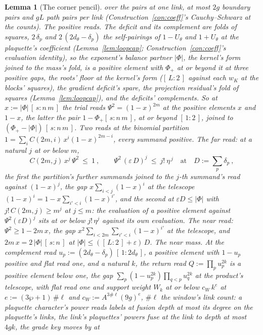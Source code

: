 \documentclass[11pt]{article}
\newtheorem{lemma}{Lemma}
\theoremstyle{definition}
\begin{document}
\begin{lemma}[The corner pencil]
over the pairs at one link, at most $2g$ boundary pairs and $gL$
path pairs per link (Construction~\ref{con:coeff}'s Cauchy--Schwarz
at the counts).
\emph{The positive reads.} The deficit and its complement are folds
of squares, $2\,\delta_p$ and $2\,(2d_\theta-\delta_p)$ the
self-pairings of $1-U_\theta$ and $1+U_\theta$ at the plaquette's
coefficient (Lemma~\ref{lem:loopcap};
Construction~\ref{con:coeff}'s evaluation identity), so the
exponent's balance partner $|\Phi|$, the kernel's form joined to
the mass's fold, is a positive element with $\Phi_+$ at or beyond
it at three positive gaps, the roots' floor at the kernel's form
($[\,L:2\,]$ against each $w_K$ at the blocks' squares), the
gradient deficit's spare, the projection residual's fold of
squares (Lemma~\ref{lem:loopcap}), and the deficits' complements.
So at $x:=|\Phi|\,[\,s:n\,m\,]$ the trial reads
$\Psi^{2}=(1-x)^{2m}$ at the positive elements $x$ and $1-x$, the
latter the pair $1-\Phi_+[\,s:n\,m\,]$, at or beyond $[\,1:2\,]$,
joined to $(\Phi_+-|\Phi|)\,[\,s:n\,m\,]$. Two reads at the
binomial partition $1=\sum_iC(2m,i)\,x^{i}(1-x)^{2m-i}$, every
summand positive. The \emph{far read}: at a natural $j$ at or
below $m$,
\[
C(2m,j)\,x^{j}\,\Psi^{2}\ \le\ 1\ ,
\qquad
\Psi^{2}\,(\varepsilon\,D)^{j}\ \le\ j!\ \eta^{\,j}
\quad\text{at}\quad D:=\sum_p\delta_p\ ,
\]
the first the partition's further summands joined to the $j$-th
summand's read against $(1-x)^{j}$, the gap
$x\sum_{i<j}(1-x)^{i}$ at the telescope
$(1-x)^{i}=1-x\sum_{i'<i}(1-x)^{i'}$, and the second at
$\varepsilon D\le|\Phi|$ with $j!\,C(2m,j)\ge m^{j}$ at $j\le m$:
the evaluation of a positive element against
$\Psi^{2}(\varepsilon D)^{j}$ sits at or below $j!\,\eta^{j}$
against its own evaluation. The \emph{near read}:
$\Psi^{2}\ge1-2m\,x$, the gap
$x^{2}\sum_{i<2m}\sum_{i'<i}(1-x)^{i'}$ at the telescope, and
$2m\,x=2\,|\Phi|\,[\,s:n\,]$ at $|\Phi|\le([\,L:2\,]+\varepsilon)\,D$.
\emph{The near mass.} At the \emph{complement read}
$u_p:=(2d_\theta-\delta_p)\,[\,1:2d_\theta\,]$, a positive element
with $1-u_p$ positive and flat read one, and a natural $k$, the
\emph{return read} $Q:=\prod_pu_p^{2k}$ is a positive element
below one, the gap $\sum_p(1-u_p^{2k})\prod_{q<p}u_q^{2k}$ at the
product's telescope, with flat read one and support weight $W_k$
at or below $c_W\,k^{e}$ at $e:=(3\wp+1)\,\#\ell$ and
$c_W:=A^{3\#\ell}(9g)^{e}$, $\#\ell$ the window's link count: a
plaquette character's power reads labels at fusion depth at most
its degree on the plaquette's links, the link's plaquettes' powers
fuse at the link to depth at most $4gk$, the grade key moves by at

\end{lemma}
\end{document}
